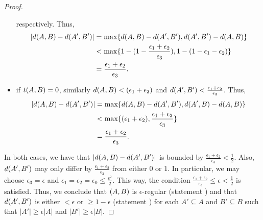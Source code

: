 \begin{lemma}
\begin{proof}
\begin{itemize}
                         respectively.
                        Thus,
                        \begin{align*}
                            | d ( A,B ) - d ( A',B' ) |
                                & = \max \{ d ( A,B ) - d ( A',B' ), d ( A',B' ) - d ( A,B ) \} \\
                                & < \max \{  1 - ( 1 - \frac{\epsilon_1 + \epsilon_2}{\epsilon_3} ),
                                    1 - ( 1 - \epsilon_1 - \epsilon_2 ) \} \\
                                & = \frac{\epsilon_1 + \epsilon_2}{\epsilon_3}.
                        \end{align*}
                    \item if $t( A,B ) = 0$, similarly $d( A,B ) < ( \epsilon_1 + \epsilon_2 )$
                        and $d ( A',B' ) < \frac{\epsilon_1 + \epsilon_2}{\epsilon_3}$.
                        Thus,
                        \begin{align*}
                            | d ( A,B ) - d ( A',B' ) |
                                & = \max \{ d ( A,B ) - d ( A',B' ), d ( A',B ) - d ( A,B ) \} \\
                                & < \max \{ ( \epsilon_1 + \epsilon_2 ), \frac{\epsilon_1 + \epsilon_2}{\epsilon_3} \} \\
                                & = \frac{\epsilon_1 + \epsilon_2}{\epsilon_3}.
                        \end{align*}
                \end{itemize}
                In both cases, we have that $| d ( A,B ) - d ( A',B' ) |$ is bounded by
                $\frac{\epsilon_1 + \epsilon_2}{\epsilon_3} < \frac{1}{2}$.
                Also, $d ( A', B' )$ may only differ by $\frac{\epsilon_1 + \epsilon_2}{\epsilon_3}$ from either
                $0$ or $1$.
                In particular, we may choose $\epsilon_3 = \epsilon$ and $\epsilon_1 = \epsilon_2 = \epsilon_0 \leq \frac{\epsilon^2}{2}$.
                This way, the condition $\frac{\epsilon_1 + \epsilon_2}{\epsilon_3} \leq \epsilon < \frac{1}{2}$ is satisfied.
                Thus, we conclude that $( A,B )$ is $\epsilon$-regular (statement )
                and that $d ( A',B' )$ is either $< \epsilon$ or $\geq 1 - \epsilon$ (statement )
                for each $A' \subseteq A$ and $B' \subseteq B$ such that $|A'| \geq \epsilon |A|$ and $|B'| \geq \epsilon |B|$.
            \end{proof}
        \end{lemma}

